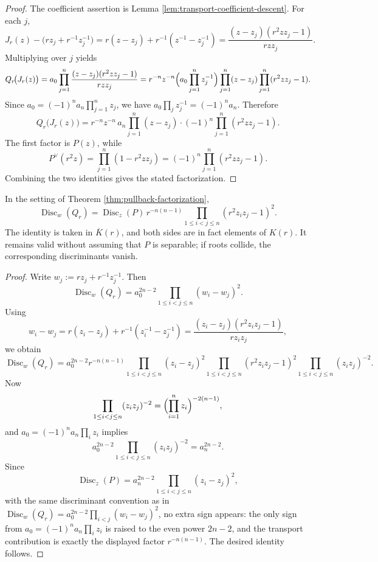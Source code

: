 \begin{proof}
The coefficient assertion is Lemma \ref{lem:transport-coefficient-descent}. For each \(j\),
\[
J_r(z)-\bigl(r z_j+r^{-1}z_j^{-1}\bigr)
=r(z-z_j)+r^{-1}(z^{-1}-z_j^{-1})
=\frac{(z-z_j)(r^2 z z_j-1)}{r z z_j}.
\]
Multiplying over \(j\) yields
\[
Q_r\!\bigl(J_r(z)\bigr)
=a_0\prod_{j=1}^{n}\frac{(z-z_j)(r^2 z z_j-1)}{r z z_j}
=r^{-n}z^{-n}\Bigl(a_0\prod_{j=1}^{n}z_j^{-1}\Bigr)\prod_{j=1}^{n}(z-z_j)\prod_{j=1}^{n}(r^2 z z_j-1).
\]
Since \(a_0=(-1)^n a_n\prod_{j=1}^{n} z_j\), we have \(a_0\prod_j z_j^{-1}=(-1)^n a_n\). Therefore
\[
Q_r\!\bigl(J_r(z)\bigr)
=r^{-n}z^{-n}\,a_n\prod_{j=1}^{n}(z-z_j)\cdot (-1)^n\prod_{j=1}^{n}(r^2 z z_j-1).
\]
The first factor is \(P(z)\), while
\[
P^\vee(r^2 z)=\prod_{j=1}^{n}(1-r^2 z z_j)=(-1)^n\prod_{j=1}^{n}(r^2 z z_j-1).
\]
Combining the two identities gives the stated factorization.
\end{proof}

\begin{theorem}\label{thm:discriminant-factorization}
In the setting of Theorem \ref{thm:pullback-factorization},
\[
\boxed{\;
\operatorname{Disc}_{w}(Q_r)
=\operatorname{Disc}_{z}(P)\,
r^{-n(n-1)}
\prod_{1\le i<j\le n}(r^2 z_i z_j-1)^2.
\;}
\]
The identity is taken in \(\overline K(r)\), and both sides are in fact elements of \(K(r)\).  It remains valid without assuming that \(P\) is separable; if roots collide, the corresponding discriminants vanish.
\end{theorem}

\begin{proof}
Write \(w_j:=r z_j+r^{-1}z_j^{-1}\). Then
\[
\operatorname{Disc}_{w}(Q_r)=a_0^{2n-2}\prod_{1\le i<j\le n}(w_i-w_j)^2.
\]
Using
\[
w_i-w_j
=r(z_i-z_j)+r^{-1}(z_i^{-1}-z_j^{-1})
=\frac{(z_i-z_j)(r^2 z_i z_j-1)}{r z_i z_j},
\]
we obtain
\[
\operatorname{Disc}_{w}(Q_r)
=a_0^{2n-2}r^{-n(n-1)}
\prod_{1\le i<j\le n}(z_i-z_j)^2
\prod_{1\le i<j\le n}(r^2 z_i z_j-1)^2
\prod_{1\le i<j\le n}(z_i z_j)^{-2}.
\]
Now
\[
\prod_{1\le i<j\le n}(z_i z_j)^{-2}
=\Bigl(\prod_{i=1}^{n} z_i\Bigr)^{-2(n-1)},
\]
and \(a_0=(-1)^n a_n\prod_i z_i\) implies
\[
a_0^{2n-2}\prod_{1\le i<j\le n}(z_i z_j)^{-2}=a_n^{2n-2}.
\]
Since
\[
\operatorname{Disc}_{z}(P)=a_n^{2n-2}\prod_{1\le i<j\le n}(z_i-z_j)^2,
\]
with the same discriminant convention as in \(\operatorname{Disc}_w(Q_r)=a_0^{2n-2}\prod_{i<j}(w_i-w_j)^2\), no extra sign appears: the only sign from \(a_0=(-1)^na_n\prod_i z_i\) is raised to the even power \(2n-2\), and the transport contribution is exactly the displayed factor \(r^{-n(n-1)}\).
The desired identity follows.
\end{proof}

